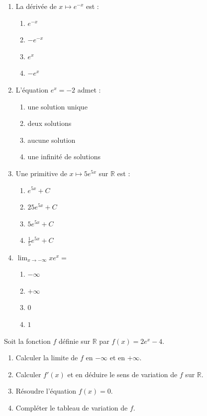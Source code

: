 \documentclass[11pt]{article}
\begin{document}
\begin{exercice}
\begin{enumerate}
    \item La dérivée de $x \mapsto e^{-x}$ est :
    \begin{enumerate}
        \item $e^{-x}$
        \item $-e^{-x}$
        \item $e^{x}$
        \item $-e^{x}$
    \end{enumerate}
    \item L'équation $e^{x} = -2$ admet :
    \begin{enumerate}
        \item une solution unique
        \item deux solutions
        \item aucune solution
        \item une infinité de solutions
    \end{enumerate}
    \item Une primitive de $x \mapsto 5e^{5x}$ sur $\mathbb{R}$ est :
    \begin{enumerate}
        \item $e^{5x} + C$
        \item $25e^{5x} + C$
        \item $5e^{5x} + C$
        \item $\frac{1}{5}e^{5x} + C$
    \end{enumerate}
    \item $\displaystyle\lim_{x \to -\infty} x e^{x} = $
    \begin{enumerate}
        \item $-\infty$
        \item $+\infty$
        \item $0$
        \item $1$
    \end{enumerate}
\end{enumerate}
\end{exercice}

\begin{exercice}
Soit la fonction $f$ définie sur $\mathbb{R}$ par $f(x) = 2e^{x} - 4$.
\begin{enumerate}
    \item Calculer la limite de $f$ en $-\infty$ et en $+\infty$.
    \item Calculer $f'(x)$ et en déduire le sens de variation de $f$ sur $\mathbb{R}$.
    \item Résoudre l'équation $f(x) = 0$.
    \item Compléter le tableau de variation de $f$.
\end{enumerate}
\end{exercice}
\end{document}
